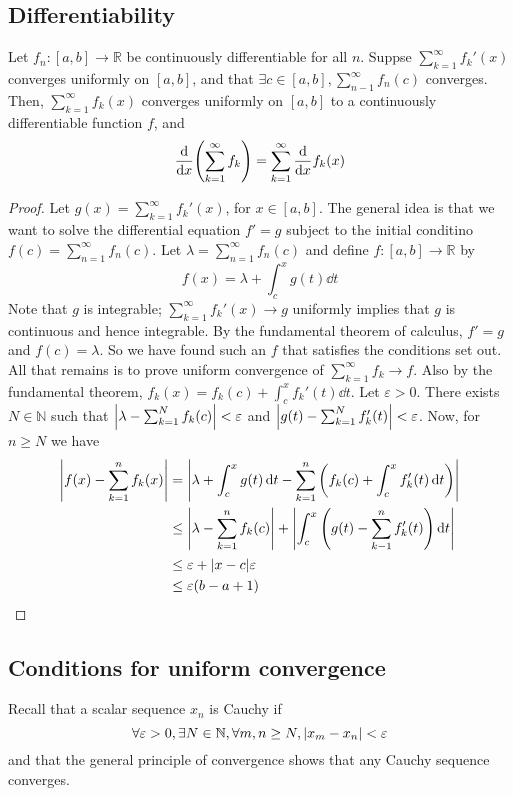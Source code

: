 \subsection{Differentiability}
\begin{theorem}
	Let \( f_n \colon [a,b] \to \mathbb R \) be continuously differentiable for all \( n \).
	Suppse \( \sum_{k=1}^\infty f_k'(x) \) converges uniformly on \( [a,b] \), and that \( \exists c \in [a,b], \sum_{n-1}^\infty f_n(c) \) converges.
	Then, \( \sum_{k=1}^\infty f_k(x) \) converges uniformly on \( [a,b] \) to a continuously differentiable function \( f \), and
	\[
		\dv{x} \qty(\sum_{k=1}^\infty f_k) = \sum_{k=1}^\infty \dv{x} f_k(x)
	\]
\end{theorem}
\begin{proof}
	Let \( g(x) = \sum_{k=1}^\infty f_k'(x) \), for \( x \in [a,b] \).
	The general idea is that we want to solve the differential equation \( f' = g \) subject to the initial conditino \( f(c) = \sum_{n=1}^\infty f_n(c) \).
	Let \( \lambda = \sum_{n=1}^\infty f_n(c) \) and define \( f \colon [a,b] \to \mathbb R \) by
	\[
		f(x) = \lambda + \int_c^x g(t) \dd{t}
	\]
	Note that \( g \) is integrable; \( \sum_{k=1}^\infty f_k'(x) \to g \) uniformly implies that \( g \) is continuous and hence integrable.
	By the fundamental theorem of calculus, \( f' = g \) and \( f(c) = \lambda \).
	So we have found such an \( f \) that satisfies the conditions set out.
	All that remains is to prove uniform convergence of \( \sum_{k=1}^\infty f_k \to f \).
	Also by the fundamental theorem, \( f_k(x) = f_k(c) + \int_c^x f_k'(t) \dd{t} \).
	Let \( \varepsilon > 0 \).
	There exists \( N \in \mathbb N \) such that \( \abs{\lambda - \sum_{k=1}^N f_k(c)} < \varepsilon \) and \( \abs{g(t) - \sum_{k=1}^N f_k'(t)} < \varepsilon \).
	Now, for \( n \geq N \) we have
	\begin{align*}
		\abs{f(x) - \sum_{k=1}^n f_k(x)} & = \abs{\lambda + \int_c^x g(t) \dd{t} - \sum_{k=1}^n \qty(f_k(c) + \int_c^x f_k'(t) \dd{t})}       \\
		                                 & \leq \abs{\lambda - \sum_{k=1}^n f_k(c)} + \abs{\int_c^x \qty(g(t) - \sum_{k-1}^n f_k'(t)) \dd{t}} \\
		                                 & \leq \varepsilon + \abs{x-c} \varepsilon                                                           \\
		                                 & \leq \varepsilon (b-a + 1)
	\end{align*}
\end{proof}

\subsection{Conditions for uniform convergence}
Recall that a scalar sequence \( x_n \) is Cauchy if
\[
	\forall \varepsilon > 0, \exists N \in \mathbb N, \forall m,n \geq N, \abs{x_m - x_n} < \varepsilon
\]
and that the general principle of convergence shows that any Cauchy sequence converges.
